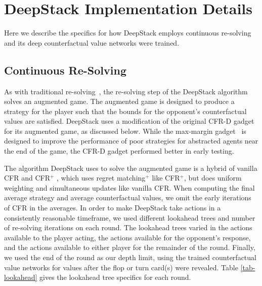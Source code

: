\section*{DeepStack Implementation Details}

Here we describe the specifics for how DeepStack employs continuous re-solving and its deep counterfactual value networks were trained.

\subsection*{Continuous Re-Solving}

As with traditional re-solving~\cite{cprg:cfrd,Moravcik16:Subgames}, the re-solving step of the DeepStack algorithm solves an augmented game.  The augmented game is designed to produce a strategy for the player such that the bounds for the opponent's counterfactual values are satisfied.  DeepStack uses a modification of the original CFR-D gadget~\cite{cprg:cfrd} for its augmented game, as discussed below.  While the max-margin gadget~\cite{Moravcik16:Subgames} is designed to improve the performance of poor strategies for abstracted agents near the end of the game, the CFR-D gadget performed better in early testing.

The  algorithm DeepStack uses to solve the augmented game is a hybrid of vanilla CFR  \cite{ZinkevichEtAl07} and CFR$^+$ \cite{Tammelin15:CFR+}, which uses regret matching$^+$ like CFR$^+$, but does uniform weighting and simultaneous updates like vanilla CFR.  When computing the final average strategy and average counterfactual values, we omit the early iterations of CFR in the averages.   In order to make DeepStack take actions in a consistently reasonable timeframe, we used different lookahead trees and number of re-solving iterations on each round.  The lookahead trees varied in the actions available to the player acting, the actions available for the opponent's response, and the actions available to either player for the remainder of the round.  Finally, we used the end of the round as our depth limit, using the trained counterfactual value networks for values after the flop or turn card(s) were revealed.  Table \ref{tab-lookahead} gives the lookahead tree specifics for each round.  

\def\halfP{\textonehalf{}P}
\def\twoP{2P}

